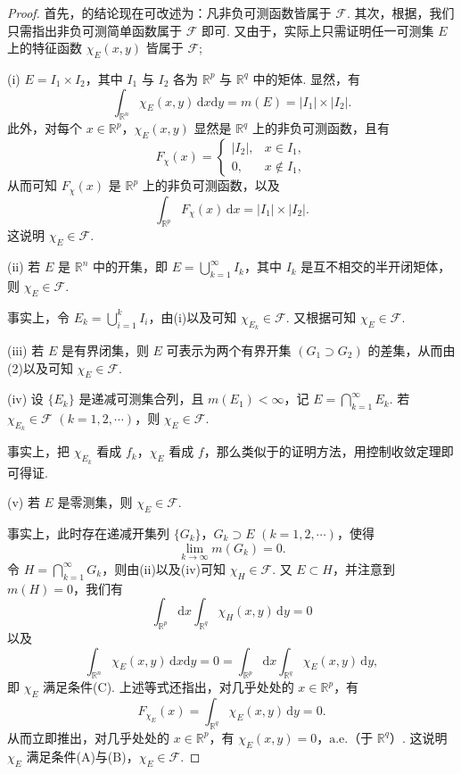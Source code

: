 \documentclass[../../main.tex]{subfiles}%
\begin{document}
\begin{proof}

首先，的结论现在可改述为：凡非负可测函数皆属于 \( \mathcal{F} \). 其次，根据，我们只需指出非负可测简单函数属于 \( \mathcal{F} \) 即可. 又由于，实际上只需证明任一可测集 \( E \) 上的特征函数 \( \chi_E(x, y) \) 皆属于 \( \mathcal{F} \);

(i) \( E = I_1 \times I_2 \)，其中 \( I_1 \) 与 \( I_2 \) 各为 \( \mathbb{R}^p \) 与 \( \mathbb{R}^q \) 中的矩体. 显然，有
\[
\int_{\mathbb{R}^n} \chi_E(x, y) \, \mathrm{d}x\mathrm{d}y = m(E) = |I_1| \times |I_2|.
\]
此外，对每个 \( x \in \mathbb{R}^p \)，\( \chi_E(x, y) \) 显然是 \( \mathbb{R}^q \) 上的非负可测函数，且有
\[
F_{\chi}(x) = 
\begin{cases} 
|I_2|, & x \in I_1, \\
0, & x \notin I_1,
\end{cases}
\]
从而可知 \( F_{\chi}(x) \) 是 \( \mathbb{R}^p \) 上的非负可测函数，以及
\[
\int_{\mathbb{R}^p} F_{\chi}(x) \, \mathrm{d}x = |I_1| \times |I_2|.
\]
这说明 \( \chi_E \in \mathcal{F} \).

(ii) 若 \( E \) 是 \( \mathbb{R}^n \) 中的开集，即 \( E = \bigcup_{k = 1}^{\infty} I_k \)，其中 \( I_k \) 是互不相交的半开闭矩体，则 \( \chi_E \in \mathcal{F} \).

事实上，令 \( E_k = \bigcup_{i = 1}^k I_i \)，由(i)以及可知 \( \chi_{E_k} \in \mathcal{F} \). 又根据可知 \( \chi_E \in \mathcal{F} \).

(iii) 若 \( E \) 是有界闭集，则 \( E \) 可表示为两个有界开集 \( (G_1 \supset G_2) \) 的差集，从而由(2)以及可知 \( \chi_E \in \mathcal{F} \).

(iv) 设 \( \{ E_k \} \) 是递减可测集合列，且 \( m(E_1) < \infty \)，记 \( E = \bigcap_{k = 1}^{\infty} E_k \). 若 \( \chi_{E_k} \in \mathcal{F} \) \( (k = 1, 2, \cdots) \)，则 \( \chi_E \in \mathcal{F} \).

事实上，把 \( \chi_{E_k} \) 看成 \( f_k \)，\( \chi_E \) 看成 \( f \)，那么类似于的证明方法，用控制收敛定理即可得证.

(v) 若 \( E \) 是零测集，则 \( \chi_E \in \mathcal{F} \).

事实上，此时存在递减开集列 \( \{ G_k \} \)，\( G_k \supset E \) \( (k = 1, 2, \cdots) \)，使得
\[
\lim_{k \to \infty} m(G_k) = 0.
\]
令 \( H = \bigcap_{k = 1}^{\infty} G_k \)，则由(ii)以及(iv)可知 \( \chi_H \in \mathcal{F} \). 又 \( E \subset H \)，并注意到 \( m(H) = 0 \)，我们有
\[
\int_{\mathbb{R}^p} \mathrm{d}x \int_{\mathbb{R}^q} \chi_H(x, y) \, \mathrm{d}y = 0
\]
以及
\[
\int_{\mathbb{R}^n} \chi_E(x, y) \, \mathrm{d}x\mathrm{d}y = 0 = \int_{\mathbb{R}^p} \mathrm{d}x \int_{\mathbb{R}^q} \chi_E(x, y) \, \mathrm{d}y,
\]
即 \( \chi_E \) 满足条件(C). 上述等式还指出，对几乎处处的 \( x \in \mathbb{R}^p \)，有
\[
F_{\chi_E}(x) = \int_{\mathbb{R}^q} \chi_E(x, y) \, \mathrm{d}y = 0.
\]
从而立即推出，对几乎处处的 \( x \in \mathbb{R}^p \)，有 \( \chi_E(x, y) = 0 \)，\(\text{a.e.}\)（于 \( \mathbb{R}^q \)）. 这说明 \( \chi_E \) 满足条件(A)与(B)，\( \chi_E \in \mathcal{F} \).


\end{proof}
\end{document}
